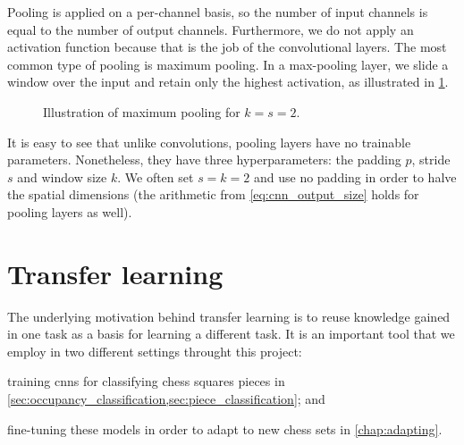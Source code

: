 \documentclass[../main.tex]{subfiles}
\begin{document}
Pooling is applied on a per-channel basis, so the number of input channels is equal to the number of output channels.
Furthermore, we do not apply an activation function because that is the job of the convolutional layers.
The most common type of pooling is maximum pooling.
In a max-pooling layer, we slide a window over the input and retain only the highest activation, as illustrated in \cref{fig:maxpool}.
\begin{figure}
    \centering
    \caption{Illustration of maximum pooling for $k=s=2$.}
    \label{fig:maxpool}
\end{figure}
It is easy to see that unlike convolutions, pooling layers have no trainable parameters.
Nonetheless, they have three hyperparameters: the padding $p$, stride $s$ and window size $k$.
We often set $s=k=2$ and use no padding in order to halve the spatial dimensions (the arithmetic from \cref{eq:cnn_output_size} holds for pooling layers as well).

\section{Transfer learning}
The underlying motivation behind transfer learning is to reuse knowledge gained in one task as a basis for learning a different task.
It is an important tool that we employ in two different settings throught this project:
\begin{enumerate*}[label=(\roman*)]
    \item training \glspl{cnn} for classifying chess squares pieces in \cref{sec:occupancy_classification,sec:piece_classification}; and
    \item fine-tuning these models in order to adapt to new chess sets in \cref{chap:adapting}.
\end{enumerate*}
\end{document}

